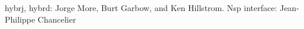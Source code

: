 \begin{manseealso}
\end{manseealso}

\begin{authors}
 hybrj, hybrd: Jorge More, Burt Garbow, and Ken Hillstrom. Nsp interface: Jean-Philippe Chancelier
\end{authors}
